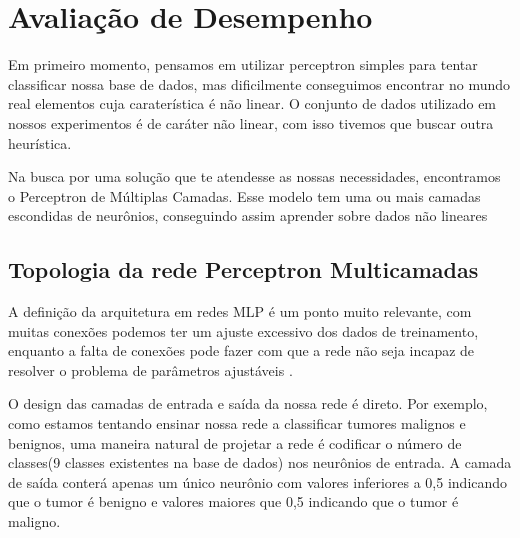 \documentclass[conference]{IEEEtran}
\begin{document}
	
	
\section{Avaliação de Desempenho}
    
    Em primeiro momento, pensamos em utilizar perceptron simples para tentar classificar nossa base de dados, mas 
    dificilmente conseguimos encontrar no mundo real elementos cuja caraterística é não linear. O conjunto de dados utilizado em nossos experimentos é de caráter não linear, com isso tivemos que buscar outra heurística.
    
    Na busca por uma solução que te atendesse as nossas necessidades, encontramos o Perceptron de Múltiplas Camadas. Esse modelo tem uma ou mais camadas escondidas de neurônios, conseguindo assim aprender sobre dados não lineares
    
    \subsection{Topologia da rede Perceptron Multicamadas}
    
    
    A definição da arquitetura em redes MLP é um ponto muito relevante, 
    com muitas conexões podemos ter um ajuste excessivo dos dados de treinamento, enquanto a falta de conexões pode fazer com que a rede não seja incapaz de resolver o problema de parâmetros ajustáveis \cite{b7}.

    O design das camadas de entrada e saída da nossa rede é direto. Por exemplo, como estamos tentando ensinar nossa rede a classificar tumores malignos e benignos, uma maneira natural de projetar a rede é codificar o número de classes(9 classes existentes na base de dados) nos neurônios de entrada. A camada de saída conterá apenas um único neurônio com valores inferiores a 0,5 indicando que  o tumor é benigno e valores maiores que 0,5 indicando que o tumor é maligno.
    
\end{document}
